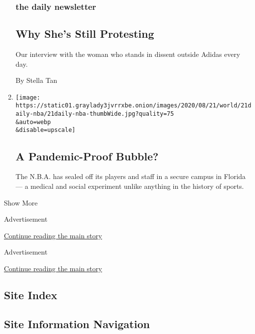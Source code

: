 \begin{enumerate}
{  \subsubsection{the daily newsletter}\label{the-daily-newsletter-2}}

  \hypertarget{why-shes-still-protesting}{%
  \subsection{Why She's Still
  Protesting}\label{why-shes-still-protesting}}

  Our interview with the woman who stands in dissent outside Adidas
  every day.

  By Stella Tan
\item
  \href{/2020/08/21/podcasts/the-daily/nba-coronavirus-basketball.html}{}

  \texttt{[image: https://static01.graylady3jvrrxbe.onion/images/2020/08/21/world/21daily-nba/21daily-nba-thumbWide.jpg?quality=75\\\&auto=webp\\\&disable=upscale]}

  \hypertarget{a-pandemic-proof-bubble}{%
  \subsection{A Pandemic-Proof Bubble?}\label{a-pandemic-proof-bubble}}

  The N.B.A. has sealed off its players and staff in a secure campus in
  Florida --- a medical and social experiment unlike anything in the
  history of sports.
\end{enumerate}

Show More

Advertisement

\protect\hyperlink{after-mid5}{Continue reading the main story}

Advertisement

\protect\hyperlink{after-mktg}{Continue reading the main story}

\hypertarget{site-index}{%
\subsection{Site Index}\label{site-index}}

\hypertarget{site-information-navigation}{%
\subsection{Site Information
Navigation}\label{site-information-navigation}}

